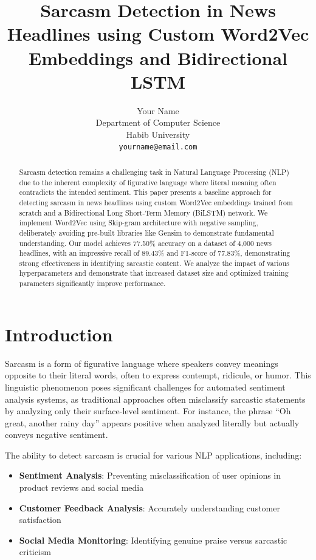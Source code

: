 \documentclass[11pt]{article}
\title{Sarcasm Detection in News Headlines using Custom Word2Vec Embeddings and Bidirectional LSTM}
\author{Your Name \\
  Department of Computer Science \\
  Habib University \\
  \texttt{yourname@email.com}}
\date{}
\begin{document}
\maketitle

\begin{abstract}
Sarcasm detection remains a challenging task in Natural Language Processing (NLP) due to the inherent complexity of figurative language where literal meaning often contradicts the intended sentiment. This paper presents a baseline approach for detecting sarcasm in news headlines using custom Word2Vec embeddings trained from scratch and a Bidirectional Long Short-Term Memory (BiLSTM) network. We implement Word2Vec using Skip-gram architecture with negative sampling, deliberately avoiding pre-built libraries like Gensim to demonstrate fundamental understanding. Our model achieves 77.50\% accuracy on a dataset of 4,000 news headlines, with an impressive recall of 89.43\% and F1-score of 77.83\%, demonstrating strong effectiveness in identifying sarcastic content. We analyze the impact of various hyperparameters and demonstrate that increased dataset size and optimized training parameters significantly improve performance.
\end{abstract}

\section{Introduction}

Sarcasm is a form of figurative language where speakers convey meanings opposite to their literal words, often to express contempt, ridicule, or humor. This linguistic phenomenon poses significant challenges for automated sentiment analysis systems, as traditional approaches often misclassify sarcastic statements by analyzing only their surface-level sentiment. For instance, the phrase ``Oh great, another rainy day'' appears positive when analyzed literally but actually conveys negative sentiment.

The ability to detect sarcasm is crucial for various NLP applications, including:
\begin{itemize}
    \item \textbf{Sentiment Analysis}: Preventing misclassification of user opinions in product reviews and social media
    \item \textbf{Customer Feedback Analysis}: Accurately understanding customer satisfaction
    \item \textbf{Social Media Monitoring}: Identifying genuine praise versus sarcastic criticism
\end{itemize}
\end{document}
